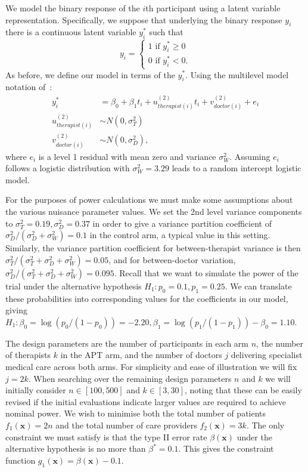 \documentclass[sagev, doublespace, Crown]{sagej}
\begin{document}
We model the binary response of the $i$th participant using a latent variable representation. Specifically, we suppose that underlying the binary response $y_i$ there is a continuous latent variable $y_i^*$ such that
$$
y_i =
\begin{cases}
1 \text{ if } y_i^* \geq 0\\
0 \text{ if } y_i^* < 0.
\end{cases}
$$
As before, we define our model in terms of the $y_i^*$. Using the multilevel model notation of~\cite{Goldstein2003}:
\begin{align}\label{eqn:ex1_model}
y_i^* &= \beta_{0} + \beta_1 t_i + u_{therapist(i)}^{(2)}t_{i} + v_{doctor(i)}^{(2)} + e_i \\
u_{therapist(i)}^{(2)} & \sim N(0, \sigma_T^2) \\
v_{doctor(i)}^{(2)} & \sim N(0, \sigma_D^2),
\end{align}
where $e_i$ is a level 1 residual with mean zero and variance $\sigma_W^2$. Assuming $e_i$ follows a logistic distribution with $\sigma_W^2 = 3.29$ leads to a random intercept logistic model.

For the purposes of power calculations we must make some assumptions about the various nuisance parameter values. We set the 2nd level variance components to $\sigma_{T}^{2} = 0.19, \sigma_{D}^{2} = 0.37$ in order to give a variance partition coefficient of $\sigma_D^2 / (\sigma^2_D + \sigma^2_W) = 0.1$ in the control arm, a typical value in this setting. Similarly, the variance partition coefficient for between-therapist variance is then $\sigma^2_T/(\sigma^2_T + \sigma^2_D + \sigma^2_W) = 0.05$, and for between-doctor variation, $\sigma^2_D/(\sigma^2_T + \sigma^2_D + \sigma^2_W) = 0.095$. Recall that we want to simulate the power of the trial under the alternative hypothesis $H_1: p_0=0.1, p_1=0.25$. We can translate these probabilities into corresponding values for the coefficients in our model, giving $H_1: \beta_0 = \log(p_0/(1-p_0)) = -2.20, \beta_1 = \log(p_1/(1-p_1)) - \beta_0 = 1.10$.

The design parameters are the number of participants in each arm $n$, the number of therapists $k$ in the APT arm, and the number of doctors $j$ delivering specialist medical care across both arms. For simplicity and ease of illustration we will fix $j = 2k$. When searching over the remaining design parameters $n$ and $k$ we will initially consider $n \in [100, 500]$ and $k \in [3, 30]$, noting that these can be easily revised if the initial evaluations indicate larger values are required to achieve nominal power. We wish to minimise both the total number of patients $f_{1}(\mathbf{x}) = 2n$ and the total number of care providers $f_{2}(\mathbf{x}) = 3k$. The only constraint we must satisfy is that the type II error rate $\beta(\mathbf{x})$ under the alternative hypothesis is no more than $\beta^{*} = 0.1$. This gives the constraint function $g_{1}(\mathbf{x}) = \beta(\mathbf{x}) - 0.1$.
\end{document}
